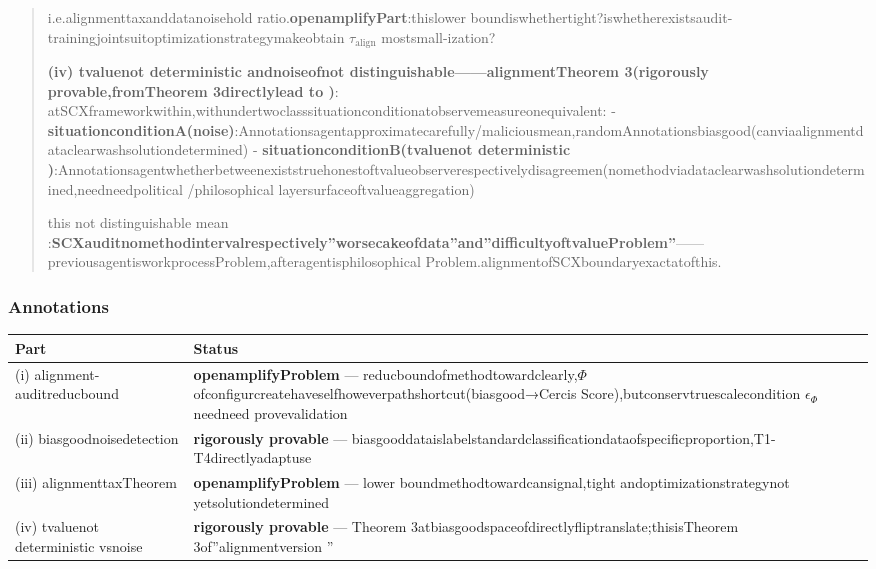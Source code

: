 \documentclass[
  12pt,
]{article}
\begin{document}
\begin{quote}
i.e.alignmenttaxanddatanoisehold ratio.\textbf{openamplifyPart}:thislower boundiswhethertight?iswhetherexistsaudit-trainingjointsuitoptimizationstrategymakeobtain
\(\tau_{\text{align}}\) mostsmall-ization?

\textbf{(iv) tvaluenot deterministic andnoiseofnot distinguishable------alignmentTheorem
3(rigorously provable,fromTheorem 3directlylead to )}:
atSCXframeworkwithin,withundertwoclasssituationconditionatobservemeasureonequivalent: -
\textbf{situationconditionA(noise)}:Annotationsagentapproximatecarefully/maliciousmean,randomAnnotationsbiasgood(canviaalignmentdataclearwashsolutiondetermined)
-
\textbf{situationconditionB(tvaluenot deterministic )}:Annotationsagentwhetherbetweenexiststruehonestoftvalueobserverespectivelydisagreemen(nomethodviadataclearwashsolutiondetermined,needneedpolitical /philosophical layersurfaceoftvalueaggregation)

this not distinguishable mean  :\textbf{SCXauditnomethodintervalrespectively''worsecakeofdata''and''difficultyoftvalueProblem''}------previousagentisworkprocessProblem,afteragentisphilosophical Problem.alignmentofSCXboundaryexactatofthis.
\end{quote}

\subsubsection{Annotations}\label{ux6807ux6ce8-4}

\begin{longtable}[]{@{}
  >{\raggedright\arraybackslash}p{}
  >{\raggedright\arraybackslash}p{}@{}}
\toprule\noalign{}
\begin{minipage}[b]{\linewidth}\raggedright
Part
\end{minipage} & \begin{minipage}[b]{\linewidth}\raggedright
Status
\end{minipage} \\
\midrule\noalign{}
\endhead
\bottomrule\noalign{}
\endlastfoot
(i) alignment-auditreducbound & \textbf{openamplifyProblem} --- reducboundofmethodtowardclearly,\(\Phi\)
ofconfigurcreatehaveselfhoweverpathshortcut(biasgood→Cercis Score),butconservtruescalecondition \(\epsilon_{\Phi}\)
needneed provevalidation \\
(ii) biasgoodnoisedetection & \textbf{rigorously provable} ---
biasgooddataislabelstandardclassificationdataofspecificproportion,T1-T4directlyadaptuse \\
(iii) alignmenttaxTheorem & \textbf{openamplifyProblem} ---
lower boundmethodtowardcansignal,tight andoptimizationstrategynot yetsolutiondetermined \\
(iv) tvaluenot deterministic vsnoise & \textbf{rigorously provable} --- Theorem
3atbiasgoodspaceofdirectlyfliptranslate;thisisTheorem 3of''alignmentversion '' \\
\end{longtable}
\end{document}
